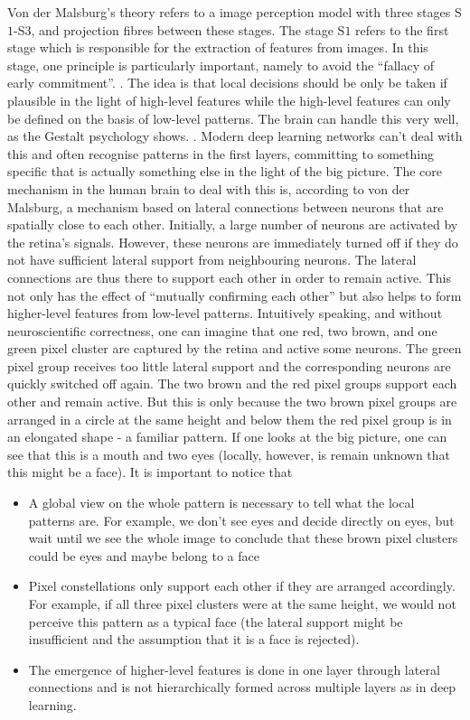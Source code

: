 Von der Malsburg's theory refers to a image perception model with three stages S$1$-S$3$, and projection fibres between these stages.
The stage S$1$ refers to the first stage which is responsible for the extraction of features from images. In this stage, one principle is particularly important, namely to avoid the ``fallacy of early commitment''. .
The idea is that local decisions should be only be taken if plausible in the light of high-level features while the high-level features can only be defined on the basis of low-level patterns.
The brain can handle this very well, as the Gestalt psychology shows. .
Modern deep learning networks can't deal with this and often recognise patterns in the first layers, committing to something specific that is actually something else in the light of the big picture. The core mechanism in the human brain to deal with this is, according to von der Malsburg, a mechanism based on lateral connections between neurons that are spatially close to each other. Initially, a large number of neurons are activated by the retina's signals. However, these neurons are immediately turned off if they do not have sufficient lateral support from neighbouring neurons. The lateral connections are thus there to support each other in order to remain active. This not only has the effect of ``mutually confirming each other'' but also helps to form higher-level features from low-level patterns. Intuitively speaking, and without neuroscientific correctness, one can imagine that one red, two brown, and one green pixel cluster are captured by the retina and active some neurons. The green pixel group receives too little lateral support and the corresponding neurons are quickly switched off again. The two brown and the red pixel groups support each other and remain active. But this is only because the two brown pixel groups are arranged in a circle at the same height and below them the red pixel group is in an elongated shape - a familiar pattern. If one looks at the big picture, one can see that this is a mouth and two eyes (locally, however, is remain unknown that this might be a face). It is important to notice that

\begin{itemize}
	\item A global view on the whole pattern is necessary to tell what the local patterns are. For example, we don't see eyes and decide directly on eyes, but wait until we see the whole image to conclude that these brown pixel clusters could be eyes and maybe belong to a face
	\item Pixel constellations only support each other if they are arranged accordingly. For example, if all three pixel clusters were at the same height, we would not perceive this pattern as a typical face (the lateral support might be insufficient and the assumption that it is a face is rejected).
	\item The emergence of higher-level features is done in one layer through lateral connections and is not hierarchically formed across multiple layers as in deep learning.
\end{itemize}


